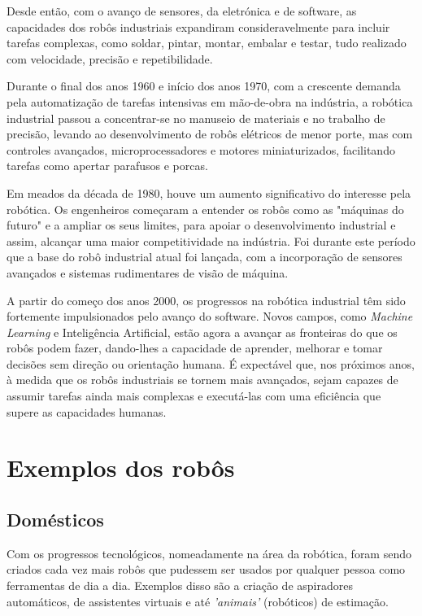 \documentclass[10pt]{article}
\begin{document}
Desde então, com o avanço de sensores, da eletrónica e de software, as capacidades dos robôs industriais expandiram consideravelmente para incluir tarefas complexas, como soldar, pintar, montar, embalar e testar, tudo realizado com velocidade, precisão e repetibilidade.

Durante o final dos anos 1960 e início dos anos 1970, com a crescente demanda pela automatização de tarefas intensivas em mão-de-obra na indústria, a robótica industrial passou a concentrar-se no manuseio de materiais e no trabalho de precisão, levando ao desenvolvimento de robôs elétricos de menor porte, mas com controles avançados, microprocessadores e motores miniaturizados, facilitando tarefas como apertar parafusos e porcas.

Em meados da década de 1980, houve um aumento significativo do interesse pela robótica. Os engenheiros começaram a entender os robôs como as "máquinas do futuro" e a ampliar os seus limites, para apoiar o desenvolvimento industrial e assim, alcançar uma maior competitividade na indústria. Foi durante este período que a base do robô industrial atual foi lançada, com a incorporação de sensores avançados e sistemas rudimentares de visão de máquina.

A partir do começo dos anos 2000, os progressos na robótica industrial têm sido fortemente impulsionados pelo avanço do software. Novos campos, como \textit{Machine Learning} e Inteligência Artificial, estão agora a avançar as fronteiras do que os robôs podem fazer, dando-lhes a capacidade de aprender, melhorar e tomar decisões sem direção ou orientação humana. É expectável que, nos próximos anos, à medida que os robôs industriais se tornem mais avançados, sejam capazes de assumir tarefas ainda mais complexas e executá-las com uma eficiência que supere as capacidades humanas.


\section{Exemplos dos robôs}
\subsection{Domésticos}
\hspace{\parindent}Com os progressos tecnológicos, nomeadamente na área da robótica, foram sendo criados cada vez mais robôs que pudessem ser usados por qualquer pessoa como ferramentas de dia a dia. Exemplos disso são a criação de aspiradores automáticos, de assistentes virtuais e até \textit{'animais'} (robóticos) de estimação.
\end{document}
